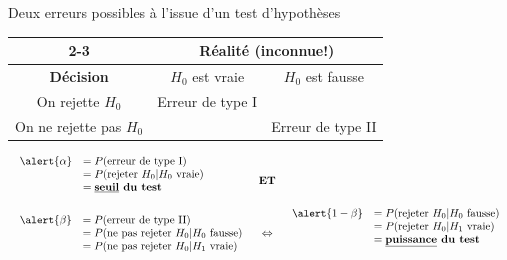 \documentclass{BeamerTemplate}
\begin{document}
\begin{frame}[t]{Deux erreurs possibles à l'issue d'un test d'hypothèses}

{\small
\begin{center}
\begin{tabular}{|c||c|c|}\cline{2-3}
\multicolumn{1}{c||}{ }&\multicolumn{2}{c|}{\bf Réalité (inconnue!)}\\\hline
{\bf Décision} & $  {H_0}$   est vraie  & $ {H_0}$  est fausse \\ \hline\hline
  On rejette $ H_0 $ & \alert{Erreur de type I} & \\ \hline
  On ne rejette pas  $ H_0 $ & & \alert{Erreur de type II} \\ \hline
\end{tabular}
\end{center}




\vspace{3mm}

$\begin{array}{lcl}
\begin{array}{ll}
\alert{\alpha}&=P(\text{erreur de type I})\\
&= P(\text{rejeter }H_0 | H_0\text{\ vraie})\\
&= \textbf{\underline{seuil} du test}\\ &\\
\end{array}  & \textbf{ET} & \\ 
\begin{array}{ll}
\alert{\beta}&=P(\text{erreur de type II}) \\
&= P(\text{ne pas rejeter }H_0 | H_0\text{\ fausse})\\
&= P(\text{ne pas rejeter }H_0 | H_1\text{\ vraie})\\
\end{array}
& \Leftrightarrow &
\begin{array}{ll}
\alert{1-\beta}&=P(\text{rejeter }H_0 | H_0\text{\ fausse})\\
&= P(\text{rejeter }H_0 | H_1\text{\ vraie})\\
&= \textbf{\underline{puissance} du test}\\&\\
\end{array}
\end{array}$
}

\end{frame}
\end{document}
